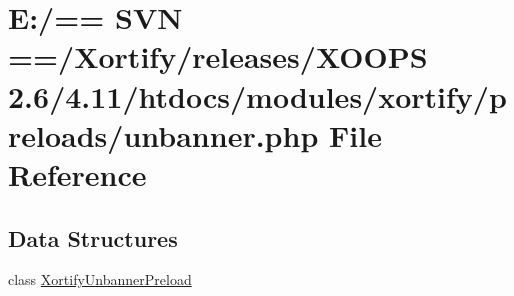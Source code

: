 \hypertarget{preloads_2unbanner_8php}{\section{E\-:/== S\-V\-N ==/\-Xortify/releases/\-X\-O\-O\-P\-S 2.6/4.11/htdocs/modules/xortify/preloads/unbanner.php File Reference}
\label{preloads_2unbanner_8php}
}
\subsection*{Data Structures}
\begin{DoxyCompactItemize}
\item 
class \hyperlink{class_xortify_unbanner_preload}{Xortify\-Unbanner\-Preload}
\end{DoxyCompactItemize}
